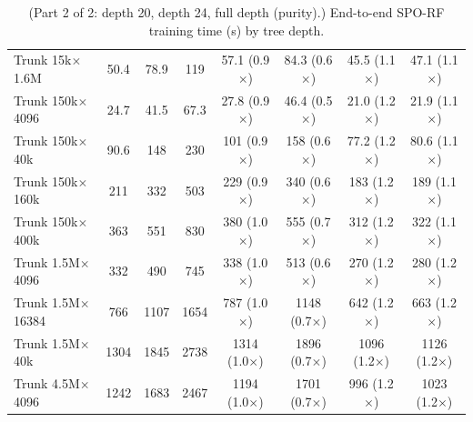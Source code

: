 \begin{table}[p]
\begin{tabular}{l|ccc|cccc}
        Trunk 15k$\times$1.6M & 50.4 & 78.9 & 119 & 57.1 (0.9$\times$) & 84.3 (0.6$\times$) & 45.5 (1.1$\times$) & 47.1 (1.1$\times$) \\
        Trunk 150k$\times$4096 & 24.7 & 41.5 & 67.3 & 27.8 (0.9$\times$) & 46.4 (0.5$\times$) & 21.0 (1.2$\times$) & 21.9 (1.1$\times$) \\
        Trunk 150k$\times$40k & 90.6 & 148 & 230 & 101 (0.9$\times$) & 158 (0.6$\times$) & 77.2 (1.2$\times$) & 80.6 (1.1$\times$) \\
        Trunk 150k$\times$160k & 211 & 332 & 503 & 229 (0.9$\times$) & 340 (0.6$\times$) & 183 (1.2$\times$) & 189 (1.1$\times$) \\
        Trunk 150k$\times$400k & 363 & 551 & 830 & 380 (1.0$\times$) & 555 (0.7$\times$) & 312 (1.2$\times$) & 322 (1.1$\times$) \\
        Trunk 1.5M$\times$4096 & 332 & 490 & 745 & 338 (1.0$\times$) & 513 (0.6$\times$) & 270 (1.2$\times$) & 280 (1.2$\times$) \\
        Trunk 1.5M$\times$16384 & 766 & 1107 & 1654 & 787 (1.0$\times$) & 1148 (0.7$\times$) & 642 (1.2$\times$) & 663 (1.2$\times$) \\
        Trunk 1.5M$\times$40k & 1304 & 1845 & 2738 & 1314 (1.0$\times$) & 1896 (0.7$\times$) & 1096 (1.2$\times$) & 1126 (1.2$\times$) \\
        Trunk 4.5M$\times$4096 & 1242 & 1683 & 2467 & 1194 (1.0$\times$) & 1701 (0.7$\times$) & 996 (1.2$\times$) & 1023 (1.2$\times$) \\
        \hline
    \end{tabular}
    \caption{(Part 2 of 2: depth 20, depth 24, full depth (purity).) End-to-end SPO-RF training time (s) by tree depth.}
    \label{tab:train-time-by-depth-p2}
\end{table}

